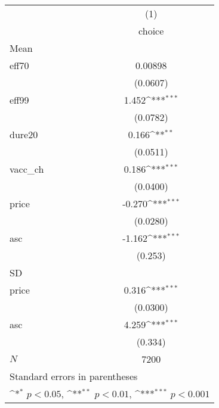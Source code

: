 {
\def\sym#1{\ifmmode^{#1}\else\(^{#1}\)\fi}
\begin{tabular}{l*{1}{c}}
\hline\hline
            &\multicolumn{1}{c}{(1)}\\
            &\multicolumn{1}{c}{choice}\\
\hline
Mean        &                     \\
eff70       &     0.00898         \\
            &    (0.0607)         \\
[1em]
eff99       &       1.452\sym{***}\\
            &    (0.0782)         \\
[1em]
dure20      &       0.166\sym{**} \\
            &    (0.0511)         \\
[1em]
vacc\_ch     &       0.186\sym{***}\\
            &    (0.0400)         \\
[1em]
price       &      -0.270\sym{***}\\
            &    (0.0280)         \\
[1em]
asc         &      -1.162\sym{***}\\
            &     (0.253)         \\
\hline
SD          &                     \\
price       &       0.316\sym{***}\\
            &    (0.0300)         \\
[1em]
asc         &       4.259\sym{***}\\
            &     (0.334)         \\
\hline
\(N\)       &        7200         \\
\hline\hline
\multicolumn{2}{l}{\footnotesize Standard errors in parentheses}\\
\multicolumn{2}{l}{\footnotesize \sym{*} \(p<0.05\), \sym{**} \(p<0.01\), \sym{***} \(p<0.001\)}\\
\end{tabular}
}
